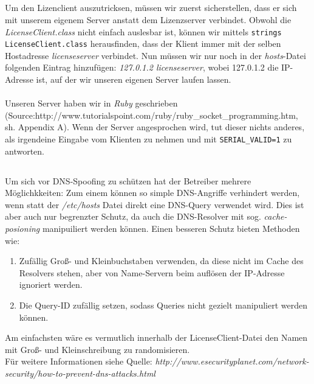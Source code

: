 \documentclass{scrartcl}
\begin{document}
    \subsection{}
    \label{sub:3.2}
      Um den Lizenclient auszutricksen, müssen wir zuerst sicherstellen, dass
      er sich mit unserem eigenem Server anstatt dem Lizenzserver verbindet.
      Obwohl die \textit{LicenseClient.class} nicht einfach auslesbar ist,
      können wir mittels \texttt{strings LicenseClient.class} herausfinden,
      dass der Klient immer mit der selben Hostadresse \textit{licenseserver}
      verbindet.
      Nun müssen wir nur noch in der \textit{hosts}-Datei folgenden Eintrag
      hinzufügen: \textit{127.0.1.2 licenseserver}, wobei 127.0.1.2 die
      IP-Adresse ist, auf der wir unseren eigenen Server laufen lassen.\\\\
      Unseren Server haben wir in \textit{Ruby} geschrieben\\
      (Source:http://www.tutorialspoint.com/ruby/ruby\_socket\_programming.htm,
      sh. Appendix A). Wenn der Server angesprochen wird, tut dieser nichts
      anderes, als irgendeine Eingabe vom Klienten zu nehmen und mit
      \texttt{SERIAL\_VALID=1} zu antworten.
    \subsection{}
    \label{sub:3.3}
      Um sich vor DNS-Spoofing zu schützen hat der Betreiber mehrere
      Möglichkkeiten: Zum einem können so simple DNS-Angriffe verhindert werden,
      wenn statt der \textit{/etc/hosts} Datei direkt eine DNS-Query verwendet
      wird. Dies ist aber auch nur begrenzter Schutz, da auch die DNS-Resolver
      mit sog. \textit{cache-posioning} manipuiliert werden können. Einen
      besseren Schutz bieten Methoden wie: \\
      \begin{enumerate}
        \item Zufällig Groß- und Kleinbuchstaben verwenden, da diese nicht im
              Cache des Resolvers stehen, aber von Name-Servern beim auflösen
              der IP-Adresse ignoriert werden.
        \item Die Query-ID zufällig setzen, sodass Queries nicht gezielt
              manipuliert werden können.
      \end{enumerate}
      Am einfachsten wäre es vermutlich innerhalb der LicenseClient-Datei den
      Namen mit Groß- und Kleinschreibung zu randomisieren.\\
      Für weitere Informationen siehe Quelle:
      \textit{http://www.esecurityplanet.com/network-security/how-to-prevent-dns-attacks.html}
\end{document}
